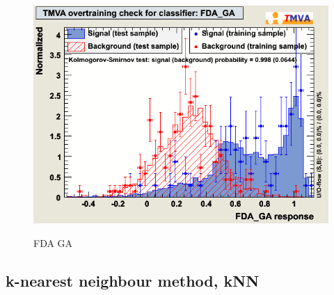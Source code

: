 \begin{figure}[h]
 \begin{minipage}{8.5cm}
\includegraphics[width=1.0\textwidth]{images/pkOvertrain_FDA_GA.png}
\end{minipage}
 \hfill
\begin{minipage}{8.5cm}
FDA GA
\end{minipage}

\label{fig:pkOvertrainFDAGA}
\end{figure}


\subsection{k-nearest neighbour method, kNN}

